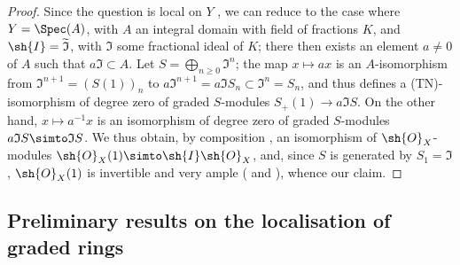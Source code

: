 \begin{proof}
Since the question is local on $Y$ , we can reduce to the case where $Y=\Spec(A)$, with $A$ an integral domain with field of fractions $K$, and $\sh{I}=\widetilde{\mathfrak{I}}$, with $\mathfrak{I}$ some fractional ideal of $K$;
there then exists an element $a\neq0$ of $A$ such that $a\mathfrak{I}\subset A$.
Let $S = \bigoplus_{n\geq0}\mathfrak{I}^n$;
the map $x\mapsto ax$ is an $A$-isomorphism from $\mathfrak{I}^{n+1} = (S(1))_n$ to $a\mathfrak{I}^{n+1} = a\mathfrak{I}S_n \subset \mathfrak{I}^n = S_n$,
and thus defines a (TN)-isomorphism of degree zero of graded $S$-modules $S_+(1)\to a\mathfrak{I}S$.
On the other hand, $x\mapsto a^{-1}x$ is an isomorphism of degree zero of graded $S$-modules $a\mathfrak{I}S \simto \mathfrak{I}S$.
We thus obtain, by composition , an isomorphism of $\sh{O}_X$-modules $\sh{O}_X(1) \simto \sh{I}\sh{O}_X$, and, since $S$ is generated by $S_1=\mathfrak{I}$, $\sh{O}_X(1)$ is invertible  and very ample ( and ), whence our claim.
\end{proof}


\subsection{Preliminary results on the localisation of graded rings}
\label{subsection:II.8.2}

